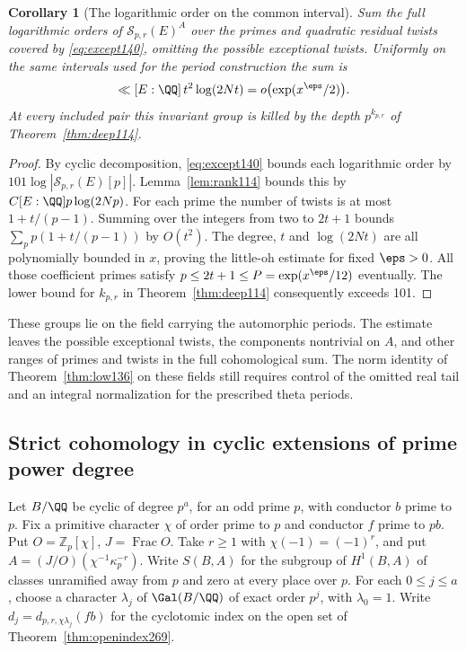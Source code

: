\documentclass[a4paper,11pt]{article}
\newtheorem{corollary}[proposition]{Corollary}
\theoremstyle{definition}
\theoremstyle{remark}
\newcommand{\ZZ}{\mathbb Z}\newcommand{\ord}{\operatorname{ord}}
\numberwithin{equation}{section}
\begin{document}
\begin{corollary}[The logarithmic order on the common interval]
\label{cor:sum140}
Sum the full logarithmic orders of \(\mathcal S_{p,r}(E)^A\)
over the primes and quadratic residual twists covered by
\eqref{eq:except140}, omitting the possible exceptional twists.
Uniformly on the same intervals used for the period construction
the sum is
\[
                \ll [E:\QQ]\,t^2\log(2Nt)
                 =o\bigl(\exp(x^\eps/2)\bigr).
\]
At every included pair this invariant group is killed by the
depth \(p^{k_{p,r}}\) of Theorem~\ref{thm:deep114}.
\end{corollary}
\begin{proof}
By cyclic decomposition, \eqref{eq:except140} bounds each
logarithmic order by \(101\log|\mathcal S_{p,r}(E)[p]|\).
Lemma~\ref{lem:rank114} bounds this by
\(C[E:\QQ]p\log(2Np)\). For each prime the number of twists is
at most \(1+t/(p-1)\). Summing over the integers from two to
\(2t+1\) bounds \(\sum_p p(1+t/(p-1))\) by \(O(t^2)\).
The degree, \(t\) and \(\log(2Nt)\) are all polynomially
bounded in \(x\), proving the little-oh estimate for fixed
\(\eps>0\). All those coefficient primes satisfy
\(p\le2t+1\le P=\exp(x^\eps/12)\) eventually. The lower bound
for \(k_{p,r}\) in Theorem~\ref{thm:deep114} consequently
exceeds 101.
\end{proof}

These groups lie on the field carrying the automorphic periods.
The estimate leaves the possible exceptional twists, the
components nontrivial on \(A\), and other ranges of primes
and twists in the full cohomological sum. The norm identity
of Theorem~\ref{thm:low136} on these fields still requires
control of the omitted real tail and an integral normalization
for the prescribed theta periods.

\subsection{Strict cohomology in cyclic extensions of prime power degree}\label{nav:IV-44}
Let \(B/\QQ\) be cyclic of degree \(p^a\), for an odd prime \(p\),
with conductor \(b\) prime to \(p\). Fix a primitive character
\(\chi\) of order prime to \(p\) and conductor \(f\) prime to
\(pb\). Put \(O=\ZZ_p[\chi]\), \(J=\operatorname{Frac}O\).
Take \(r\ge1\) with \(\chi(-1)=(-1)^r\), and put
\(A=(J/O)(\chi^{-1}\kappa_p^{-r})\).
Write \(S(B,A)\) for the subgroup of \(H^1(B,A)\) of classes
unramified away from \(p\) and zero at every place over \(p\).
For each \(0\le j\le a\), choose a character \(\lambda_j\) of
\(\Gal(B/\QQ)\) of exact order \(p^j\), with \(\lambda_0=1\).
Write \(d_j=d_{p,r,\chi\lambda_j}(fb)\) for the cyclotomic
index on the open set of Theorem~\ref{thm:openindex269}.
\end{document}
